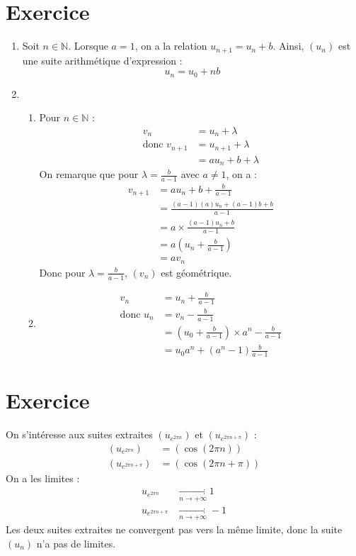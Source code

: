 \documentclass{report}
\begin{document}
\section{Exercice}
\begin{enumerate}
    \item Soit $n \in \mathbb{N}$. Lorsque $a = 1$, on a la relation $u_{n+1} = u_n + b$. 
    Ainsi, $(u_n)$ est une suite arithmétique d'expression : 
    $$u_n = u_0 + nb$$

    \item \begin{enumerate}
        \item Pour $n \in \mathbb{N}$ : 
        \begin{align*}
            v_n &= u_n + \lambda \\
            \text{donc } v_{n+1} &= u_{n+1} + \lambda \\
            &= a u_{n} + b + \lambda
        \end{align*}
        On remarque que pour $\lambda = \frac{b}{a-1}$ avec $a \neq 1$, on a :
        \begin{align*}
            v_{n+1} &= a u_n + b + \frac{b}{a - 1} \\
            &= \frac{(a-1) (a) u_n + (a-1)b + b}{a - 1} \\
            &= a \times \frac{(a-1) u_n + b}{a-1} \\
            &= a \left( u_n + \frac{b}{a - 1} \right) \\
            &= a v_n
        \end{align*}
        Donc pour $\lambda = \frac{b}{a-1}$, $(v_n)$ est géométrique. 

        \item \begin{align*}
            v_n &= u_n + \frac{b}{a-1} \\
            \text{donc } u_n &= v_n - \frac{b}{a-1} \\
            &= \left( u_0 + \frac{b}{a-1} \right) \times a^n - \frac{b}{a-1} \\
            &= u_0 a^n + (a^n - 1) \frac{b}{a-1}
        \end{align*}
    \end{enumerate}
\end{enumerate}

\setcounter{section}{8}
\section{Exercice}
On s'intéresse aux suites extraites $(u_{e^{2\pi n}})$ et $(u_{e^{2\pi n + \pi}})$ : 
\begin{align*}
    (u_{e^{2\pi n}}) &= (\cos (2\pi n)) \\
    (u_{e^{2\pi n + \pi}}) &= (\cos (2\pi n + \pi))
\end{align*}
On a les limites : 
\begin{align*}
    u_{e^{2\pi n}} &\underset{n \to +\infty}{\longrightarrow} 1 \\
    u_{e^{2\pi n + \pi}} &\underset{n \to +\infty}{\longrightarrow}  -1
\end{align*}
Les deux suites extraites ne convergent pas vers la même limite, donc la suite $(u_n)$ n'a pas de limites. 
\end{document}

